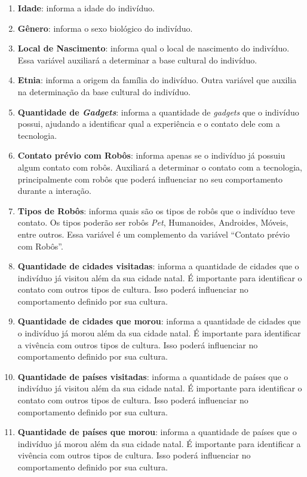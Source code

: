 \begin{enumerate}
    \item \textbf{Idade}: informa a idade do indivíduo.
    \item \textbf{Gênero}: informa o sexo biológico do indivíduo.
    \item \textbf{Local de Nascimento}: informa qual o local de nascimento do indivíduo. Essa variável auxiliará a determinar a base cultural do indivíduo.
    \item \textbf{Etnia}: informa a origem da família do indivíduo. Outra variável que auxilia na determinação da base cultural do indivíduo.
    \item \textbf{Quantidade de \emph{Gadgets}}: informa a quantidade de \emph{gadgets} que o indivíduo possui, ajudando a identificar qual a experiência e o contato dele com a tecnologia.
    \item \textbf{Contato prévio com Robôs}: informa apenas se o indivíduo já possuiu algum contato com robôs. Auxiliará a determinar o contato com a tecnologia, principalmente com robôs que poderá influenciar no seu comportamento durante a interação.
    \item \textbf{Tipos de Robôs}: informa quais são os tipos de robôs que o indivíduo teve contato. Os tipos poderão ser robôs \emph{Pet}, Humanoides, Androides, Móveis, entre outros. Essa variável é um complemento da variável ``Contato prévio com Robôs''.
    \item \textbf{Quantidade de cidades visitadas}: informa a quantidade de cidades que o indivíduo já visitou além da sua cidade natal. É importante para identificar o contato com outros tipos de cultura. Isso poderá influenciar no comportamento definido por sua cultura.
    \item \textbf{Quantidade de cidades que morou}: informa a quantidade de cidades que o indivíduo já morou além da sua cidade natal. É importante para identificar a vivência com outros tipos de cultura. Isso poderá influenciar no comportamento definido por sua cultura.
    \item \textbf{Quantidade de países visitadas}: informa a quantidade de países que o indivíduo já visitou além da sua cidade natal. É importante para identificar o contato com outros tipos de cultura. Isso poderá influenciar no comportamento definido por sua cultura.
    \item \textbf{Quantidade de países que morou}: informa a quantidade de países que o indivíduo já morou além da sua cidade natal. É importante para identificar a vivência com outros tipos de cultura. Isso poderá influenciar no comportamento definido por sua cultura.
\end{enumerate}

